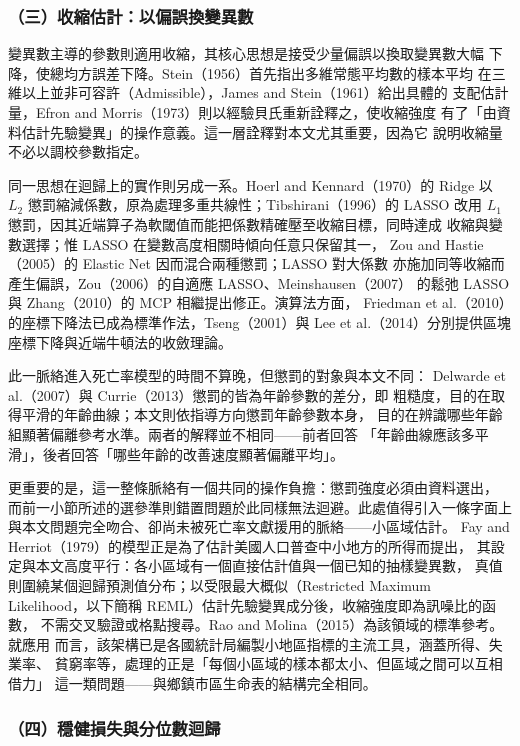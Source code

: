 \documentclass[UTF8, fontset=macnew, a4paper, 12pt]{ctexart}
\begin{document}
\subsubsection{（三）收縮估計：以偏誤換變異數}

變異數主導的參數則適用收縮，其核心思想是接受少量偏誤以換取變異數大幅
下降，使總均方誤差下降。Stein（1956）首先指出多維常態平均數的樣本平均
在三維以上並非可容許（Admissible），James and Stein（1961）給出具體的
支配估計量，Efron and Morris（1973）則以經驗貝氏重新詮釋之，使收縮強度
有了「由資料估計先驗變異」的操作意義。這一層詮釋對本文尤其重要，因為它
說明收縮量不必以調校參數指定。

同一思想在迴歸上的實作則另成一系。Hoerl and Kennard（1970）的 Ridge 以
$L_2$ 懲罰縮減係數，原為處理多重共線性；Tibshirani（1996）的 LASSO 改用
$L_1$ 懲罰，因其近端算子為軟閾值而能把係數精確壓至收縮目標，同時達成
收縮與變數選擇；惟 LASSO 在變數高度相關時傾向任意只保留其一，
Zou and Hastie（2005）的 Elastic Net 因而混合兩種懲罰；LASSO 對大係數
亦施加同等收縮而產生偏誤，Zou（2006）的自適應 LASSO、Meinshausen（2007）
的鬆弛 LASSO 與 Zhang（2010）的 MCP 相繼提出修正。演算法方面，
Friedman et al.（2010）的座標下降法已成為標準作法，Tseng（2001）與
Lee et al.（2014）分別提供區塊座標下降與近端牛頓法的收斂理論。

此一脈絡進入死亡率模型的時間不算晚，但懲罰的對象與本文不同：
Delwarde et al.（2007）與 Currie（2013）懲罰的皆為年齡參數的差分，即
粗糙度，目的在取得平滑的年齡曲線；本文則依指導方向懲罰年齡參數本身，
目的在辨識哪些年齡組顯著偏離參考水準。兩者的解釋並不相同——前者回答
「年齡曲線應該多平滑」，後者回答「哪些年齡的改善速度顯著偏離平均」。

更重要的是，這一整條脈絡有一個共同的操作負擔：懲罰強度必須由資料選出，
而前一小節所述的選參準則錯置問題於此同樣無法迴避。此處值得引入一條字面上
與本文問題完全吻合、卻尚未被死亡率文獻援用的脈絡——小區域估計。
Fay and Herriot（1979）的模型正是為了估計美國人口普查中小地方的所得而提出，
其設定與本文高度平行：各小區域有一個直接估計值與一個已知的抽樣變異數，
真值則圍繞某個迴歸預測值分布；以受限最大概似（Restricted Maximum
Likelihood，以下簡稱 REML）估計先驗變異成分後，收縮強度即為訊噪比的函數，
不需交叉驗證或格點搜尋。Rao and Molina（2015）為該領域的標準參考。就應用
而言，該架構已是各國統計局編製小地區指標的主流工具，涵蓋所得、失業率、
貧窮率等，處理的正是「每個小區域的樣本都太小、但區域之間可以互相借力」
這一類問題——與鄉鎮市區生命表的結構完全相同。

\subsubsection{（四）穩健損失與分位數迴歸}
\end{document}
